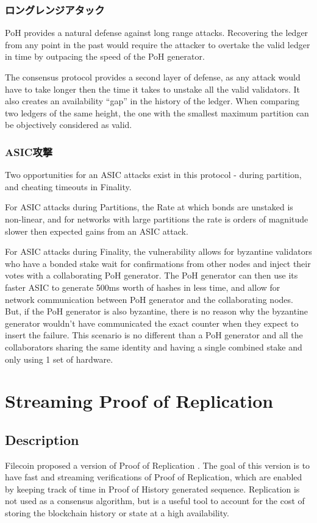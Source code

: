 \documentclass[12pt]{ltjsarticle}
\begin{document}
\subsubsection{ロングレンジアタック}\label{censorship}
PoH provides a natural defense against long range attacks. Recovering the ledger from any point in the past would require the attacker to overtake the valid ledger in time by outpacing the speed of the PoH generator.

The consensus protocol provides a second layer of defense, as any attack would have to take longer then the time it takes to unstake all the valid validators. It also creates an availability “gap” in the history of the ledger. When comparing two ledgers of the same height, the one with the smallest maximum partition can be objectively considered as valid.

\subsubsection{ASIC攻撃}\label{censorship}

Two opportunities for an ASIC attacks exist in this protocol - during partition, and cheating timeouts in Finality.

For ASIC attacks during Partitions, the Rate at which bonds are unstaked is non-linear, and for networks with large partitions the rate is orders of magnitude slower then expected gains from an ASIC attack.

For ASIC attacks during Finality, the vulnerability allows for byzantine validators who have a bonded stake wait for confirmations from other nodes and inject their votes with a collaborating PoH generator. The PoH generator can then use its faster ASIC to generate 500ms worth of hashes in less time, and allow for network communication between PoH generator and the collaborating nodes. But, if the PoH generator is also byzantine, there is no reason why the byzantine generator wouldn’t have communicated the exact counter when they expect to insert the failure. This scenario is no different than a PoH generator and all the collaborators sharing the same identity and having a single combined stake and only using 1 set of hardware.

\section{Streaming Proof of Replication}\label{porep}
\subsection{Description}
Filecoin proposed a version of Proof of Replication \cite{filecoinporep}. The goal of this version is to have fast and streaming verifications of Proof of Replication, which are enabled by keeping track of time in Proof of History generated sequence. Replication is not used as a consensus algorithm, but is a useful tool to account for the cost of storing the blockchain history or state at a high availability.
\end{document}
